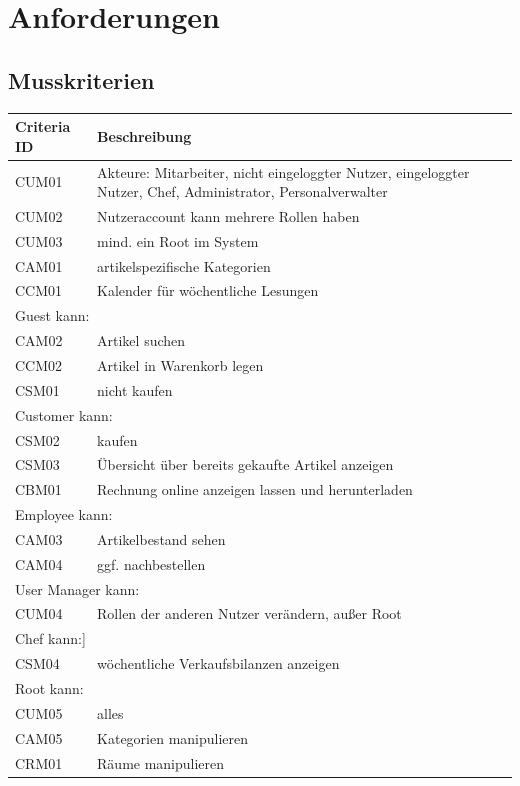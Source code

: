 \documentclass[a4paper]{article}
\begin{document}
\section{Anforderungen}

\subsection{Musskriterien}

\begin{longtable}{|p{100px}|p{250px}|}
	\hline
	\rowcolor[HTML]{C0C0C0}
	Criteria ID & Beschreibung \\ \hline
	CUM01 & Akteure: Mitarbeiter, nicht eingeloggter Nutzer, eingeloggter Nutzer, Chef, Administrator, Personalverwalter \\ \hline
	CUM02 & Nutzeraccount kann mehrere Rollen haben \\ \hline
	CUM03 & mind. ein Root im System  \\ \hline
	CAM01 & artikelspezifische Kategorien  \\ \hline
	CCM01 & Kalender für wöchentliche Lesungen  \\ \hline
	\multicolumn{2}{|l|}{Guest kann:} \\ \hline
	CAM02 & Artikel suchen \\ \hline
	CCM02 & Artikel in Warenkorb legen \\ \hline
	CSM01 & nicht kaufen \\ \hline
	\multicolumn{2}{|l|}{Customer kann:} \\ \hline
	CSM02 & kaufen \\ \hline
	CSM03 & Übersicht über bereits gekaufte Artikel anzeigen \\ \hline
	CBM01 & Rechnung online anzeigen lassen und herunterladen \\ \hline
	\multicolumn{2}{|l|}{Employee kann:} \\ \hline
	CAM03 & Artikelbestand sehen \\ \hline
	CAM04 & ggf. nachbestellen \\ \hline
	\multicolumn{2}{|l|}{User Manager kann:} \\ \hline
	CUM04 & Rollen der anderen Nutzer verändern, außer Root \\ \hline
	\multicolumn{2}{|l|}{Chef kann:]} \\ \hline
	CSM04 & wöchentliche Verkaufsbilanzen anzeigen \\ \hline
	\multicolumn{2}{|l|}{Root kann:} \\ \hline
	CUM05 & alles \\ \hline
	CAM05 & Kategorien manipulieren \\ \hline
	CRM01 & Räume manipulieren \\ \hline
\end{longtable}
\end{document}
